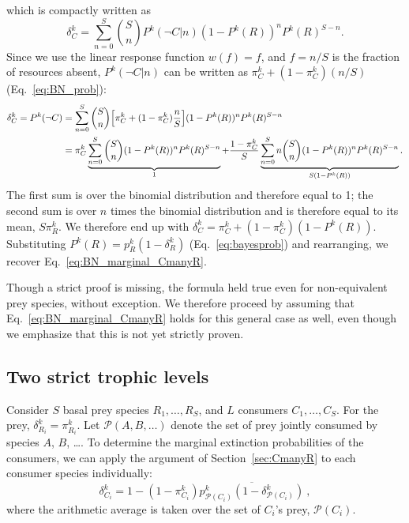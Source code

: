 \documentclass[11pt]{article}
\newcommand{\ol}[1]{\overline{#1}}
\let\originalleft\left
\let\originalright\right
\renewcommand{\left}{\mathopen{}\mathclose\bgroup\originalleft}
\renewcommand{\right}{\aftergroup\egroup\originalright}
\begin{document}
which is compactly written as
\begin{equation}
  \label{eq:BN_marginal_twolayer_3}
  \delta_C^k = \sum_{n=0}^S \binom{S}{n} P^k(\neg C|n) (1-P^k(R))^n P^k(R)^{S-n} .
\end{equation}
Since we use the linear response function $w(f) = f$, and $f = n/S$ is the fraction of resources absent, $P^k(\neg C|n)$ can be written as $\pi_C^k + (1-\pi_C^k) (n / S)$ (Eq.~\ref{eq:BN_prob}):
\begin{equation}
  \label{eq:BN_marginal_twolayer_4}
  \begin{split}
    \delta_C^k = P^k(\neg C) &= \sum_{n=0}^S \binom{S}{n} \left[ \pi_C^k +
      (1-\pi_C^k) \frac{n}{S} \right] (1-P^k(R))^n P^k(R)^{S-n}
    \\ &= \pi_C^k \underbrace{\sum_{n=0}^S \binom{S}{n} (1-P^k(R))^n
      P^k(R)^{S-n}}_{1} + \frac{1-\pi_C^k}{S} \underbrace{\sum_{n=0}^S
      n \binom{S}{n} (1-P^k(R))^n P^k(R)^{S-n}}_{S (1-P^k(R))} .
  \end{split}
\end{equation}
The first sum is over the binomial distribution and therefore equal to 1; the second sum is over $n$ times the binomial distribution and is therefore equal to its mean, $S \pi_R^k$. We therefore end up with $\delta_C^k = \pi_C^k + (1 - \pi_C^k) (1 - P^k(R))$. Substituting $P^k(R) = p_{R}^k (1 - \delta_R^k)$ (Eq.~\ref{eq:bayesprob}) and rearranging, we recover Eq.~\ref{eq:BN_marginal_CmanyR}.

Though a strict proof is missing, the formula held true even for non-equivalent prey species, without exception. We therefore proceed by assuming that Eq.~\ref{eq:BN_marginal_CmanyR} holds for this general case as well, even though we emphasize that this is not yet strictly proven.

\subsection{Two strict trophic levels} \label{sec:2level}

Consider $S$ basal prey species $R_1,\ldots, R_S$, and $L$ consumers $C_1,\ldots,C_S$. For the prey, $\delta_{R_i}^k = \pi_{R_i}^k$. Let $\mathcal{P}(A,B,\ldots)$ denote the set of prey jointly consumed by species $A$, $B$, \ldots. To determine the marginal extinction probabilities of the consumers, we can apply the argument of Section~\ref{sec:CmanyR} to each consumer species individually:
\begin{equation}
  \label{eq:BN_marginal_twolevel_C}
  \delta_{C_i}^k = 1 - (1 - \pi_{C_i}^k) \ol{p_{\mathcal{P}(C_i)}^k
    (1 - \delta_{\mathcal{P}(C_i)}^k)} \ ,
\end{equation}
where the arithmetic average is taken over the set of $C_i$'s prey, $\mathcal{P}(C_i)$.
\end{document}
